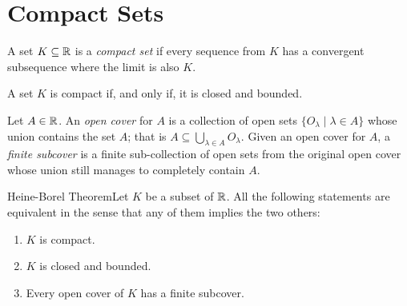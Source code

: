 


\section{Compact Sets}

\begin{definition}
    A set \(K \subseteq \mathbb{R}\) is a \textit{compact set} if every sequence from \(K\) has a convergent subsequence where the limit is also \(K\).
\end{definition}

\begin{theorem}
    A set \(K\) is compact if, and only if, it is closed and bounded.
\end{theorem}


\begin{definition}
    Let \(A \in \mathbb{R}\). An \textit{open cover} for \(A\) is a collection of open sets \(\{O_\lambda \mid \lambda \in A\}\) whose union contains the set \(A\); that is \(A \subseteq \bigcup_{\lambda \in A}O_\lambda\). Given an open cover for \(A\), a \textit{finite subcover} is a finite sub-collection of open sets from the original open cover whose union still manages to completely contain \(A\).
\end{definition}

\begin{ntheorem}
    {Heine-Borel Theorem}Let \(K\) be a  subset of  \(\mathbb{R}\). All the following statements are equivalent in the sense that any of them implies the two others: 
    \begin{enumerate}[label=(\roman*)]
        \item \(K\) is compact.
        \item \(K\) is closed and bounded.
        \item Every open cover of \(K\) has a finite subcover.
    \end{enumerate}
\end{ntheorem}

